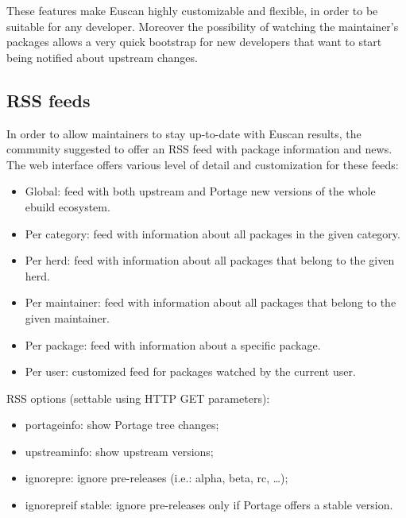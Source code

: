 These features make Euscan highly customizable and flexible, in order to be suitable for any developer. Moreover the possibility of watching the maintainer's packages allows a very quick bootstrap for new developers that want to start being notified about upstream changes.


\subsection{RSS feeds}
\label{subsec:rss}

In order to allow maintainers to stay up-to-date with Euscan results, the community suggested to offer an RSS feed with package information and news. The web interface offers various level of detail and customization for these feeds:
\begin{itemize}
\item Global: feed with both upstream and Portage new versions of the whole ebuild ecosystem.

\item Per category: feed with information about all packages in the given category.

\item Per herd: feed with information about all packages that belong to the given herd.

\item Per maintainer: feed with information about all packages that belong to the given maintainer.

\item Per package: feed with information about a specific package.

\item Per user: customized feed for packages watched by the current user.
\end{itemize}

\vspace{0.5cm}

RSS options (settable using HTTP GET parameters):
\begin{itemize}
\item portage\textunderscore info: show Portage tree changes;
\item upstream\textunderscore info: show upstream versions;
\item ignore\textunderscore pre: ignore pre-releases (i.e.: alpha, beta, rc, \ldots);
\item ignore\textunderscore pre\textunderscore if \textunderscore stable: ignore pre-releases only if Portage offers a stable version.
\end{itemize}


